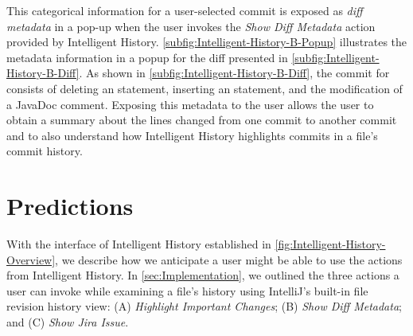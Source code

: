 This categorical information for a user-selected commit is exposed as \emph{diff metadata} in a pop-up when the user invokes the \textit{Show Diff Metadata} action provided by Intelligent History.
\autoref{subfig:Intelligent-History-B-Popup} illustrates the metadata information in a popup for the diff presented in \autoref{subfig:Intelligent-History-B-Diff}.
As shown in \autoref{subfig:Intelligent-History-B-Diff}, the commit  for  consists of deleting an  statement, inserting an  statement, and the modification of a JavaDoc comment.
Exposing this metadata to the user allows the user to obtain a summary about the lines changed from one commit to another commit and to also understand how Intelligent History highlights commits in a file's commit history.

\section{Predictions}
\label{sec:Predictions}

With the interface of Intelligent History established in \autoref{fig:Intelligent-History-Overview}, we describe how we anticipate a user might be able to use the actions from Intelligent History. 
In \autoref{sec:Implementation}, we outlined the three actions a user can invoke while examining a file's history using IntelliJ's built-in file revision history view: (A) \textit{Highlight Important Changes}; (B) \textit{Show Diff Metadata}; and (C) \textit{Show Jira Issue}.

\endinput

Any text after an \endinput is ignored.
You could put scraps here or things in progress.